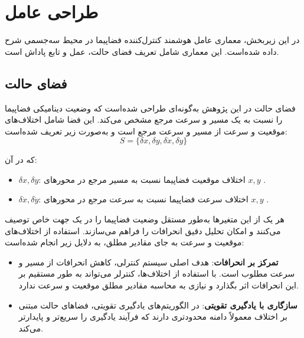 	\section{طراحی عامل}\label{sec:agent_design}

در این زیربخش، معماری عامل هوشمند کنترل‌کننده فضاپیما در محیط سه‌جسمی شرح داده شده‌است. این معماری شامل تعریف فضای حالت، عمل و تابع پاداش است.


\subsection{ فضای حالت}

فضای حالت
در این پژوهش به‌گونه‌ای طراحی شده‌است که وضعیت دینامیکی فضاپیما را نسبت به یک مسیر و سرعت مرجع مشخص می‌کند. این فضا شامل اختلاف‌های موقعیت و سرعت از مسیر و سرعت مرجع  است و به‌صورت زیر تعریف شده‌است:
\[
S = \{ \delta x, \delta y, \delta \dot{x}, \delta \dot{y} \}
\]

که در آن:
\begin{itemize}
	\item \( \delta x, \delta y \): اختلاف موقعیت فضاپیما نسبت به مسیر مرجع در محورهای \( x, y \) .
	\item \( \delta \dot{x}, \delta \dot{y} \): اختلاف سرعت فضاپیما نسبت به سرعت مرجع در محورهای \( x, y \) .
\end{itemize}

هر یک از این متغیرها به‌طور مستقل وضعیت فضاپیما را در یک جهت خاص توصیف می‌کنند و امکان تحلیل دقیق انحرافات را فراهم می‌سازند.
استفاده از اختلاف‌های موقعیت و سرعت به جای مقادیر مطلق، به دلایل زیر انجام شده‌است:
\begin{itemize}
	\item \textbf{تمرکز بر انحرافات}: هدف اصلی سیستم کنترلی، کاهش انحرافات از مسیر و سرعت مطلوب است. با استفاده از اختلاف‌ها، کنترلر می‌تواند به طور مستقیم بر این انحرافات اثر بگذارد و نیازی به محاسبه مقادیر مطلق موقعیت و سرعت ندارد.
	\item \textbf{سازگاری با یادگیری تقویتی}: در الگوریتم‌های یادگیری تقویتی، فضاهای حالت مبتنی بر اختلاف معمولاً دامنه محدودتری دارند که فرآیند یادگیری را سریع‌تر و پایدارتر می‌کند.
\end{itemize}


